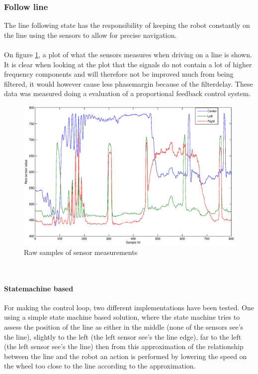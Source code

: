\documentclass[final, english, a4paper]{article}
\begin{document}
	    \subsubsection{Follow line}
	        The line following state has the responsibility of keeping the robot
		    constantly on the line using the sensors to allow for precise navigation.\\
		    \\
		    On figure \ref{fig:sensor_measurements}, a plot of what the sensors
		    measures when driving on a line is shown. It is clear when
		    looking at the plot that the signals do not contain a lot of higher
		    frequency components and will therefore not be improved much from being filtered,
		    it would however cause less phasemargin because of the filterdelay. 
		    These data was measured
		    doing a evaluation of a proportional feedback control system.
		    \\
		    \begin{figure}[htp]
                \centering
    	        \includegraphics[scale=0.45]{sensor_measurements}
	            \caption{Raw samples of sensor measurements}\label{fig:sensor_measurements}
            \end{figure}
            \\
            
            \paragraph{Statemachine based}
            For making the control loop, two different implementations have been
            tested. One using a simple state machine based solution, where the
            state machine tries to assess the position of the line as either 
            in the middle (none of the sensors see's the line), slightly to the left (the left sensor see's the
	         line edge), far to the left (the left sensor see's the line)
	        then from this approximation of the relationship between
	        the line and the robot an action is performed by lowering the speed
	        on the wheel too close to the line according to the approximation.\\
            \\
\end{document}
